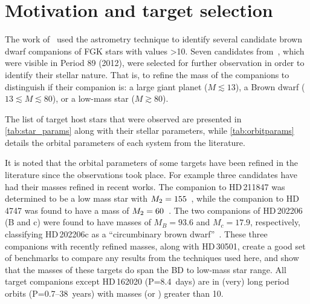 
\section{Motivation and target selection}
\label{sec:target_motivation}

The work of~\citet{sahlmann_search_2011} used the astrometry technique to identify several candidate brown dwarf companions of {FGK} stars with \Mtwosini{} values >10\Mjup{}.
Seven candidates from~\citet{sahlmann_search_2011}, which were visible in {Period 89} (2012), were selected for further observation in order to identify their stellar nature.
That is, to refine the mass of the companions to distinguish if their companion is: a large giant planet (\(M \apprle 13\)\Mjup{}), a Brown dwarf (\(13 \apprle M \apprle 80\)\Mjup{}), or a low-mass star (\(M \apprge 80\)\Mjup).

The list of target host stars that were observed are presented in \cref{tab:star_params} along with their stellar parameters, while \cref{tab:orbitparams} details the orbital parameters of each system from the literature.

It is noted that the orbital parameters of some targets have been refined in the literature since the observations took place.
For example three candidates have had their masses refined in recent works.
The companion to {HD\,211847} was determined to be a low mass star with \({M}_{2}=155\)\Mjup{}~\citep{moutou_eccentricity_2017}, while the companion to {HD\,4747} was found to have a mass of \({M}_{2}=60\)\Mjup{}~\citep{crepp_trends_2016}.
The two companions of {HD\,202206} (B and c) were found to have masses of \({M}_{B}=93.6\)\Mjup{} and \({M}_{c}=17.9\)\Mjup{}, respectively, classifying {HD\,202206}c as a ``circumbinary brown dwarf''~\citep{benedict_hd_2017}.
These three companions with recently refined masses, along with {HD\,30501}, create a good set of benchmarks to compare any results from the techniques used here, and show that the masses of these targets do span the {BD} to low-mass star range.
All target companions except {HD\,162020} (P=8.4~days) are in (very) long period orbits (P=0.7--38~years) with masses (or \Mtwosini{}) greater than 10\Mjup{}.

\begin{landscape}
    
    
\end{landscape}

